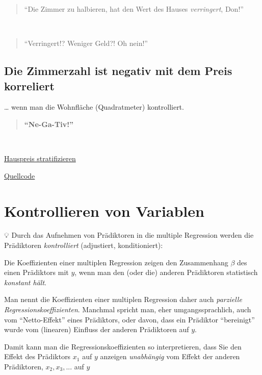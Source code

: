 \documentclass[
  a4paper,
  DIV=11]{scrreprt}
\theoremstyle{definition}
\theoremstyle{remark}
\begin{document}
\begin{quote}
``Die Zimmer zu halbieren, hat den Wert des Hauses \emph{verringert},
Don!''
\end{quote}

👩

\begin{quote}
``Verringert!? Weniger Geld?! Oh nein!'' 🧑
\end{quote}

\hypertarget{die-zimmerzahl-ist-negativ-mit-dem-preis-korreliert}{%
\subsection{Die Zimmerzahl ist negativ mit dem Preis
korreliert}\label{die-zimmerzahl-ist-negativ-mit-dem-preis-korreliert}}

\ldots{} wenn man die Wohnfläche (Quadratmeter) kontrolliert.

\begin{quote}
\textbf{``Ne-Ga-Tiv!''}
\end{quote}

👩

\href{img/hauspreis1.png}{Hauspreis stratifizieren}

\href{https://github.com/sebastiansauer/QM2-Folien/blob/main/Themen/children/Hauspreis-stratifizieren.Rmd}{Quellcode}

\hypertarget{kontrollieren-von-variablen}{%
\section{Kontrollieren von
Variablen}\label{kontrollieren-von-variablen}}

💡 Durch das Aufnehmen von Prädiktoren in die multiple Regression werden
die Prädiktoren \emph{kontrolliert} (adjustiert, konditioniert):

Die Koeffizienten einer multiplen Regression zeigen den Zusammenhang
\(\beta\) des einen Prädiktors mit \(y\), wenn man den (oder die)
anderen Prädiktoren statistisch \emph{konstant hält}.

Man nennt die Koeffizienten einer multiplen Regression daher auch
\emph{parzielle Regressionskoeffizienten}. Manchmal spricht man, eher
umgangssprachlich, auch vom ``Netto-Effekt'' eines Prädiktors, oder
davon, dass ein Prädiktor ``bereinigt'' wurde vom (linearen) Einfluss
der anderen Prädiktoren auf \(y\).

Damit kann man die Regressionskoeffizienten so interpretieren, dass Sie
den Effekt des Prädiktors \(x_1\) auf \(y\) anzeigen \emph{unabhängig}
vom Effekt der anderen Prädiktoren, \(x_2,x_3,...\) auf \(y\)
\end{document}
